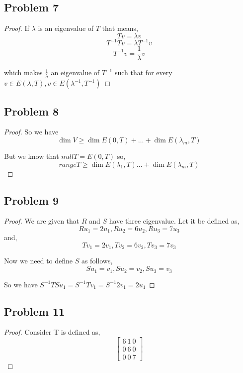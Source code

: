 \documentclass[a4paper]{report}
\begin{document}
\subsection*{Problem 7}
\begin{proof}
   If $\lambda$ is an eigenvalue of $T$ that means, 
   $$  Tv = \lambda v$$ 
   $$ T^{-1}Tv = \lambda T^{-1}v $$ 
   $$ T^{-1}v = \frac{1}{\lambda}v $$ 

   which makes $\frac{1}{\lambda}$ an eigenvalue of $T^{-1}$ such that for every  $v \in E(\lambda, T), v \in E(\lambda^{-1}, T^{-1})$
\end{proof}
\subsection*{Problem 8}
\begin{proof}
   So we have $$\dim V \ge \dim E(0, T) + \dots + \dim E(\lambda_m, T) $$

   But we know that $null T = E(0, T)$ so,
$$ range T \ge \dim E(\lambda_1,T) \dots + \dim E(\lambda_m, T) $$
\end{proof}
\subsection*{Problem 9}
\begin{proof}
   We are given that $R$ and $S$ have three eigenvalue. Let it be defined as, 
   $$ Ru_1 = 2u_1, Ru_2 = 6u_2, Ru_3 = 7u_3 $$  and, 
   $$ Tv_1 = 2v_1, Tv_2 = 6v_2, Tv_3 = 7v_3 $$ 

   Now we need to define $S$ as follows, 
   $$ Su_1 = v_1, Su_2 = v_2, Su_3 = v_3 $$

   So we have $S^{-1}TSu_1 = S^{-1}Tv_1 = S^{-1}2v_1 = 2u_1$
\end{proof}
\subsection*{Problem 11}
\begin{proof}
   Consider T is defined as, 
   $$ \begin{bmatrix}6 \ 1 \ 0 \\  0 \ 6 \ 0 \\ 0 \ 0 \ 7 \end{bmatrix} $$ 
\end{proof}
\end{document}
